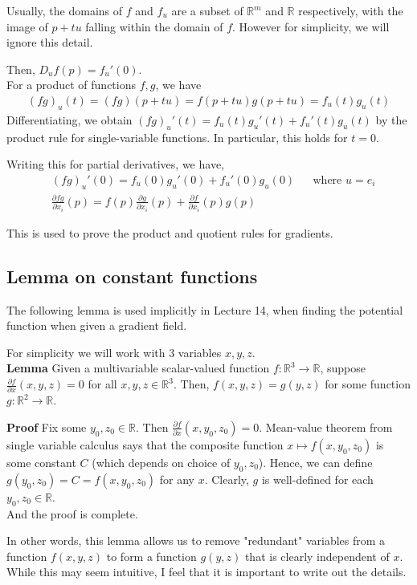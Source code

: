 \documentclass{article}
\begin{document}
Usually, the domains of $f$ and $f_u$ are a subset of $\mathbb{R}^m$ and $\mathbb{R}$ respectively, with the image of $p+tu$ falling within the domain of $f$. However for simplicity, we will ignore this detail.

Then, $D_uf(p)=f_u'(0)$.\\
For a product of functions $f,g$, we have 
\begin{align*}
	(fg)_u(t)=(fg)(p+tu)=f(p+tu)g(p+tu)=f_u(t)g_u(t)
\end{align*}
Differentiating, we obtain $(fg)_u'(t)=f_u(t)g_u'(t)+f_u'(t)g_u(t)$ by the product rule for single-variable functions. In particular, this holds for $t=0$.

Writing this for partial derivatives, we have,
\begin{align*}
	&(fg)_u'(0)=f_u(0)g_u'(0)+f_u'(0)g_u(0) &&\text{where $u=e_i$}\\
	&\frac{\partial fg}{\partial x_i}(p)=f(p)\frac{\partial g}{\partial x_i}(p)+\frac{\partial f}{\partial x_i}(p)g(p)
\end{align*}

This is used to prove the product and quotient rules for gradients.


\subsection{Lemma on constant functions}
The following lemma is used implicitly in Lecture 14, when finding the potential function when given a gradient field.

For simplicity we will work with 3 variables $x,y,z$.\\
\textbf{Lemma} Given a multivariable scalar-valued function $f:\mathbb{R}^3\rightarrow \mathbb{R}$, suppose $\frac{\partial f}{\partial x}(x,y,z)=0$ for all $x,y,z\in \mathbb{R}^3$. Then, $f(x,y,z)=g(y,z)$ for some function $g:\mathbb{R}^2\rightarrow \mathbb{R}$.

\textbf{Proof} Fix some $y_0,z_0\in \mathbb{R}$. Then $\frac{\partial f}{\partial x}(x,y_0,z_0)=0$. Mean-value theorem from single variable calculus says that the composite function $x\mapsto f(x,y_0,z_0)$ is some constant $C$ (which depends on choice of $y_0,z_0$). Hence, we can define $g(y_0,z_0)=C=f(x,y_0,z_0)$ for any $x$. Clearly, $g$ is well-defined for each $y_0,z_0\in \mathbb{R}$.\\
And the proof is complete.

In other words, this lemma allows us to remove "redundant" variables from a function $f(x,y,z)$ to form a function $g(y,z)$ that is clearly independent of $x$.\\
While this may seem intuitive, I feel that it is important to write out the details.
\end{document}
